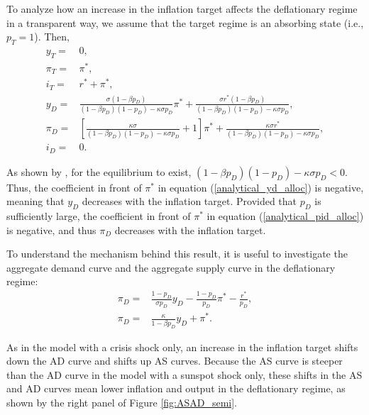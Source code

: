 \documentclass[11pt]{article}
\begin{document}
\begin{singlespace}


		To analyze how an increase in the inflation target affects the deflationary regime in a transparent way, we assume that the target regime is an absorbing state (i.e., $p_{T}=1$). Then,
		\begin{align}
			y_T =& 0,  \\
			\pi_T =& \pi^*, \\
			i_T =& r^* + \pi^*, \\
			y_D =& \frac{\sigma(1-\beta p_D)}{(1-\beta p_D)(1-p_D) -\kappa\sigma p_D}\pi^{*} + \frac{\sigma r^*(1-\beta p_D)}{(1-\beta p_D)(1-p_D) -\kappa\sigma p_D},\label{analytical_yd_alloc}\\
			\pi_D =& \left[\frac{\kappa\sigma}{(1-\beta p_D)(1-p_D) -\kappa\sigma p_D} + 1\right]\pi^*+\frac{\kappa\sigma r^*}{(1-\beta p_D)(1-p_D) -\kappa\sigma p_D},\label{analytical_pid_alloc}\\
			i_D =& 0.
		\end{align}

		\noindent As shown by \citet{NakataSchmidt2019}, for the equilibrium to exist, $(1-\beta p_D)(1-p_D) -\kappa\sigma p_D <0$. Thus, the coefficient in front of $\pi^*$ in equation (\ref{analytical_yd_alloc}) is negative, meaning that $y_D$ decreases with the inflation target. Provided that $p_{D}$ is sufficiently large, the coefficient in front of $\pi^*$ in equation (\ref{analytical_pid_alloc}) is negative, and thus $\pi_D$ decreases with the inflation target.

		To understand the mechanism behind this result, it is useful to investigate the aggregate demand curve and the aggregate supply curve in the deflationary regime:
		\begin{align}
			\pi_D =& \frac{1-p_D}{\sigma p_D}y_D - \frac{1-p_D}{p_D}\pi^* - \frac{r^*}{p_D},\\
			\pi_D =& \frac{\kappa }{1-\beta p_D}y_D+\pi^*.
		\end{align}

		\noindent As in the model with a crisis shock only, an increase in the inflation target shifts down the AD curve and shifts up AS curves. Because the AS curve is steeper than the AD curve in the model with a sunspot shock only, these shifts in the AS and AD curves mean lower inflation and output in the deflationary regime, as shown by the right panel of Figure \ref{fig:ASAD_semi}.


\end{singlespace}
\end{document}

